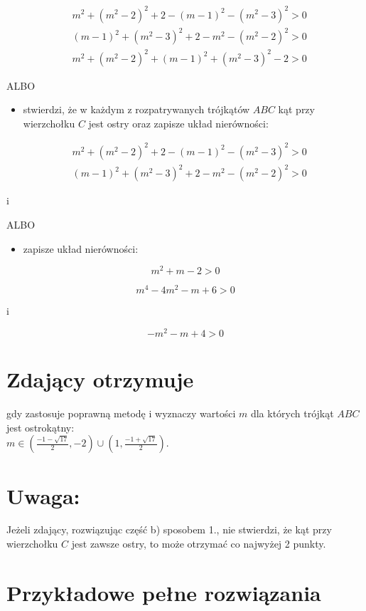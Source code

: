 \documentclass[10pt]{article}
\begin{document}
$$
\begin{aligned}
& m^{2}+\left(m^{2}-2\right)^{2}+2-(m-1)^{2}-\left(m^{2}-3\right)^{2}>0 \\
& (m-1)^{2}+\left(m^{2}-3\right)^{2}+2-m^{2}-\left(m^{2}-2\right)^{2}>0 \\
& m^{2}+\left(m^{2}-2\right)^{2}+(m-1)^{2}+\left(m^{2}-3\right)^{2}-2>0
\end{aligned}
$$

ALBO

\begin{itemize}
  \item stwierdzi, że w każdym z rozpatrywanych trójkątów $A B C$ kąt przy wierzchołku $C$ jest ostry oraz zapisze układ nierówności:
\end{itemize}

$$
\begin{aligned}
& m^{2}+\left(m^{2}-2\right)^{2}+2-(m-1)^{2}-\left(m^{2}-3\right)^{2}>0 \\
& (m-1)^{2}+\left(m^{2}-3\right)^{2}+2-m^{2}-\left(m^{2}-2\right)^{2}>0
\end{aligned}
$$

i

ALBO

\begin{itemize}
  \item zapisze układ nierówności:
\end{itemize}

$$
m^{2}+m-2>0
$$

$$
m^{4}-4 m^{2}-m+6>0
$$

i

$$
-m^{2}-m+4>0
$$

\section*{Zdający otrzymuje}
gdy zastosuje poprawną metodę i wyznaczy wartości $m$ dla których trójkąt $A B C$ jest ostrokątny:\\
$m \in\left(\frac{-1-\sqrt{17}}{2},-2\right) \cup\left(1, \frac{-1+\sqrt{17}}{2}\right)$.

\section*{Uwaga:}
Jeżeli zdający, rozwiązując część b) sposobem 1., nie stwierdzi, że kąt przy wierzchołku $C$ jest zawsze ostry, to może otrzymać co najwyżej 2 punkty.

\section*{Przykładowe pełne rozwiązania}
\end{document}

